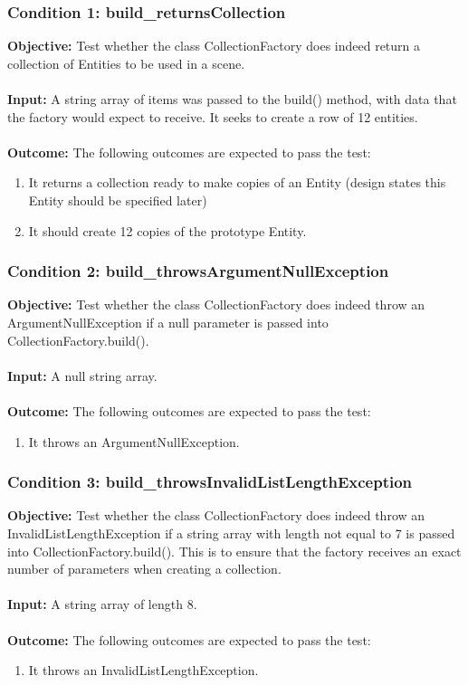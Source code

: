 \documentclass[a4paper,12pt]{article}
\begin{document}
		\subsubsection{Condition 1: build\_returnsCollection}
			\textbf{Objective:} Test whether the class CollectionFactory does indeed return a collection of Entities to be used in a scene.\\\\
			\textbf{Input:} A string array of items was passed to the build() method, with data that the factory would expect to receive. It seeks to create a row of 12 entities.\\\\
			\textbf{Outcome:} The following outcomes are expected to pass the test:
				\begin{enumerate}
					\item It returns a collection ready to make copies of an Entity (design states this Entity should be specified later)
					\item It should create 12 copies of the prototype Entity.
				\end{enumerate}
		\subsubsection{Condition 2: build\_throwsArgumentNullException}
			\textbf{Objective:} Test whether the class CollectionFactory does indeed throw an ArgumentNullException if a null parameter is passed into CollectionFactory.build().\\\\
			\textbf{Input:} A null string array.\\\\
			\textbf{Outcome:} The following outcomes are expected to pass the test:
				\begin{enumerate}
					\item It throws an ArgumentNullException.
				\end{enumerate}
		\subsubsection{Condition 3: build\_throwsInvalidListLengthException}
			\textbf{Objective:} Test whether the class CollectionFactory does indeed throw an InvalidListLengthException if a string array with length not equal to 7 is passed into CollectionFactory.build(). This is to ensure that the factory receives an exact number of parameters when creating a collection.\\\\
			\textbf{Input:} A string array of length 8.\\\\
			\textbf{Outcome:} The following outcomes are expected to pass the test:
				\begin{enumerate}
					\item It throws an InvalidListLengthException.
				\end{enumerate}
\end{document}
